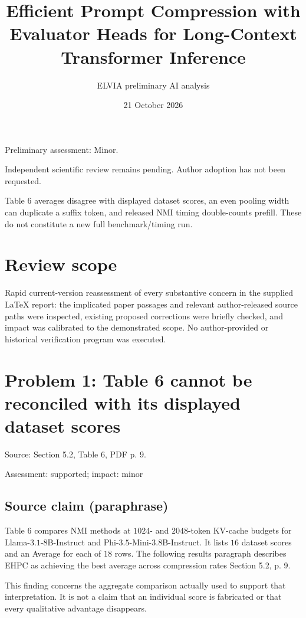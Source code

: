 \documentclass[11pt]{article}
\begin{document}
\title{Efficient Prompt Compression with Evaluator Heads for Long-Context Transformer Inference}

\author{ELVIA preliminary AI analysis}\date{21 October 2026}\maketitle

Preliminary assessment: Minor.\par

Independent scientific review remains pending. Author adoption has not been requested.

Table 6 averages disagree with displayed dataset scores, an even pooling width can duplicate a suffix token, and released NMI timing double-counts prefill. These do not constitute a new full benchmark/timing run.

\section*{Review scope}

Rapid current-version reassessment of every substantive concern in the supplied LaTeX report: the implicated paper passages and relevant author-released source paths were inspected, existing proposed corrections were briefly checked, and impact was calibrated to the demonstrated scope. No author-provided or historical verification program was executed.

\section*{Problem 1: Table 6 cannot be reconciled with its displayed dataset scores}

Source: Section 5.2, Table 6, PDF p. 9.

Assessment: supported; impact: minor

\subsection*{Source claim (paraphrase)}

Table 6 compares NMI methods at \(1024\)- and \(2048\)-token KV-cache budgets for Llama-\(3.1\)-8B-Instruct and Phi-\(3.5\)-Mini-3.8B-Instruct. It lists \(16\) dataset scores and an Average for each of \(18\) rows. The following results paragraph describes EHPC as achieving the best average across compression rates Section 5.2, p. 9.

This finding concerns the aggregate comparison actually used to support that interpretation. It is not a claim that an individual score is fabricated or that every qualitative advantage disappears.
\end{document}
